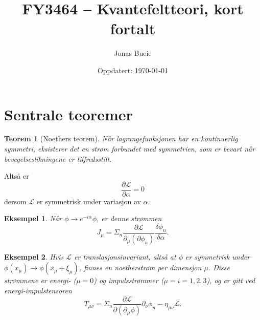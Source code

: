 \documentclass{article}
\title{FY3464 -- Kvantefeltteori, kort fortalt}
\author{Jonas Bueie}
\date{Oppdatert: \today}
\newtheorem{theorem}{Teorem}
\newtheorem{example}{Eksempel}
\renewcommand{\L}{\mathcal{L}}
\begin{document}
\maketitle

\tableofcontents


\section{Sentrale teoremer}
\begin{theorem}[Noethers teorem]
    Når lagrangefunksjonen har en kontinuerlig symmetri, eksisterer det en strøm forbundet med symmetrien, som er bevart når bevegelseslikningene er tilfredsstilt.
\end{theorem}

Altså er
\begin{equation*}
    \frac{\partial \L}{\partial \alpha} = 0
\end{equation*}
dersom $\L$ er symmetrisk under variasjon av $\alpha$.

\begin{example}
    Når $\phi \rightarrow e^{-i \alpha}\phi$, er denne strømmen
    \begin{equation*}
        J_\mu = \Sigma_n \frac{\partial \L}{\partial_\mu (\partial \phi_n)} \frac{\delta \phi_n}{\delta \alpha}.
    \end{equation*}
\end{example}

\begin{example}
    Hvis $\L$ er translasjonsinvariant, altså at $\phi$ er symmetrisk under $\phi(x_\mu) \rightarrow \phi(x_\mu + \xi_\mu)$, finnes en noetherstrøm per dimensjon $\mu$.
    Disse strømmene er energi- ($\mu = 0$) og impulsstrømmer ($\mu = i = 1, 2, 3$), og er gitt ved energi-impulstensoren
    \begin{equation*}
        T_{\mu \nu} = \Sigma_n \frac{\partial \L}{\partial (\partial_\mu \phi)} \partial_\nu \phi_n - \eta_{\mu \nu} \L.
    \end{equation*}
\end{example}
\end{document}
